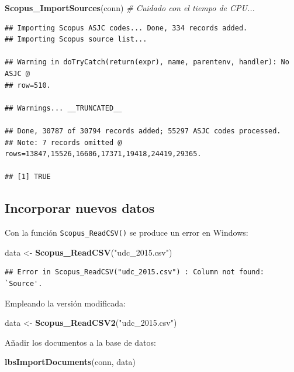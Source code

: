 \documentclass[]{book}
\newenvironment{Shaded}{\begin{snugshade}}{\end{snugshade}}
\newcommand{\KeywordTok}[1]{\textcolor[rgb]{0.13,0.29,0.53}{\textbf{#1}}}
\newcommand{\StringTok}[1]{\textcolor[rgb]{0.31,0.60,0.02}{#1}}
\newcommand{\CommentTok}[1]{\textcolor[rgb]{0.56,0.35,0.01}{\textit{#1}}}
\newcommand{\NormalTok}[1]{#1}
\begin{document}
\begin{Shaded}
\begin{Highlighting}[]
\KeywordTok{Scopus_ImportSources}\NormalTok{(conn) }\CommentTok{# Cuidado con el tiempo de CPU...}
\end{Highlighting}
\end{Shaded}

\begin{verbatim}
## Importing Scopus ASJC codes... Done, 334 records added.
## Importing Scopus source list...

## Warning in doTryCatch(return(expr), name, parentenv, handler): No ASJC @
## row=510.

## Warnings... __TRUNCATED__

## Done, 30787 of 30794 records added; 55297 ASJC codes processed.
## Note: 7 records omitted @ rows=13847,15526,16606,17371,19418,24419,29365.

## [1] TRUE
\end{verbatim}

\subsection{Incorporar nuevos datos}\label{incorporar-nuevos-datos}

Con la función \texttt{Scopus\_ReadCSV()} se produce un error en
Windows:

\begin{Shaded}
\begin{Highlighting}[]
\NormalTok{data <-}\StringTok{  }\KeywordTok{Scopus_ReadCSV}\NormalTok{(}\StringTok{"udc_2015.csv"}\NormalTok{)}
\end{Highlighting}
\end{Shaded}

\begin{verbatim}
## Error in Scopus_ReadCSV("udc_2015.csv") : Column not found: `Source'.
\end{verbatim}

Empleando la versión modificada:

\begin{Shaded}
\begin{Highlighting}[]
\NormalTok{data <-}\StringTok{  }\KeywordTok{Scopus_ReadCSV2}\NormalTok{(}\StringTok{"udc_2015.csv"}\NormalTok{)}
\end{Highlighting}
\end{Shaded}

Añadir los documentos a la base de datos:

\begin{Shaded}
\begin{Highlighting}[]
\KeywordTok{lbsImportDocuments}\NormalTok{(conn, data) }
\end{Highlighting}
\end{Shaded}
\end{document}
